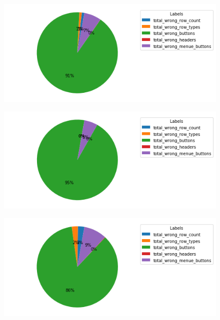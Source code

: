 \documentclass[pdftex,a4paper,halfparskip, article]{scrartcl}
\begin{document}
\begin{figure}
\centering
\begin{minipage}{.33\textwidth}
  \centering
  \includegraphics[width=1\linewidth]{predictions_bin18_2_total_error_types_pie_chart}
  \label{fig:fehler_gesamt_bin18_2}
\end{minipage}%
\begin{minipage}{.33\textwidth}
  \centering
  \includegraphics[width=1\linewidth]{predictions_bin18_2_excluded_p80_error_types_pie_chart}
  \label{fig:fehler_beste80_bin18_2}
\end{minipage}
\begin{minipage}{.33\textwidth}
  \centering
   \includegraphics[width=1\linewidth]{predictions_bin18_2_p80_error_types_pie_chart}
  \label{fig:fehler_schlechteste20_bin18_2}
\end{minipage}
\end{figure}
\end{document}

